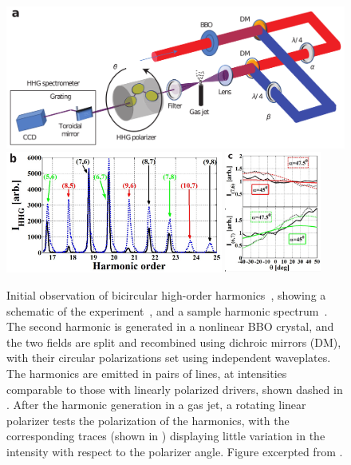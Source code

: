 \begin{figure}[b!]
  \centering
  \subfigure{\label{f8-fleischer-bicircular-spectrum-a}}
  \includegraphics[scale=0.85]{8-Spin-HHG/Figures/figure8Ba.png}
  \\[4mm]
  \subfigure{\label{f8-fleischer-bicircular-spectrum-b}}
  \includegraphics[height=4cm]{8-Spin-HHG/Figures/figure8Bb.png}
  \hspace{5mm}
  \subfigure{\label{f8-fleischer-bicircular-spectrum-c}}
  \includegraphics[height=4cm]{8-Spin-HHG/Figures/figure8Bc.png}
  \caption[
  Initial observation of bicircular high-order harmonics by A. Fleischer~et~al.
  ]{
  Initial observation of bicircular high-order harmonics~\cite{fleischer_spin_2014}, showing a schematic of the experiment~\protect{}, and a sample harmonic spectrum~\protect{}. The second harmonic is generated in a nonlinear BBO crystal, and the two fields are split and recombined using dichroic mirrors (DM), with their circular polarizations set using independent waveplates. 
  The harmonics are emitted in pairs of lines, at intensities comparable to those with linearly polarized drivers, shown dashed in \protect{}.
  After the harmonic generation in a gas jet, a rotating linear polarizer tests the polarization of the harmonics, with the corresponding traces (shown in \protect{}) displaying little variation in the intensity with respect to the polarizer angle.
  Figure excerpted from .
  }
  \label{f8-fleischer-bicircular-spectrum}
\end{figure}
